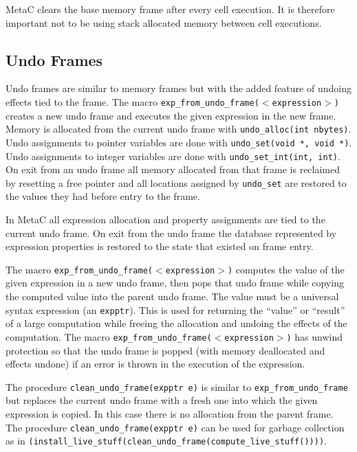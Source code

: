 \documentclass{article}
\begin{document}
MetaC clears the base memory frame after every cell execution.
It is therefore important not to be using
stack allocated memory between cell executions.

\subsection{Undo Frames}
\label{sec:undo}
Undo frames are similar to memory frames but with the added feature of undoing effects tied to the frame.
The macro {\tt exp\_from\_undo\_frame($<$expression$>$)} creates a new undo frame and executes the given expression
in the new frame. Memory is allocated from the current undo frame
with {\tt undo\_alloc(int nbytes)}.  Undo assignments to pointer variables are done with
{\tt undo\_set(void *, void *)}.
Undo assignments to integer variables are done with 
{\tt undo\_set\_int(int, int)}.
On exit from an undo frame all memory allocated from that frame is reclaimed by resetting a free pointer
and all locations assigned by {\tt undo\_set} are restored to the values they had before entry to the frame.

In MetaC all expression allocation and property assignments are tied to the current undo frame.
On exit from the undo frame the database represented by expression properties is restored to
the state that existed on frame entry.

The macro {\tt exp\_from\_undo\_frame($<$expression$>$)} computes the value of the given expression in a new undo frame, then pops that undo frame while
copying the computed value into the parent undo frame.  The value must be a universal syntax expression
(an {\tt expptr}). This is used for returning the ``value'' or ``result'' of a large computation while freeing the allocation
and undoing the effects of the computation.
The macro {\tt exp\_from\_undo\_frame($<$expression$>$)} has unwind protection so that the undo frame is popped (with memory deallocated and effects undone)
if an error is thrown in the execution of the expression.

The procedure {\tt clean\_undo\_frame(expptr e)} is similar to {\tt exp\_from\_undo\_frame} but replaces the current undo frame with a fresh one
into which the given expression is copied.  In this case there is no allocation from the parent frame.
The procedure {\tt clean\_undo\_frame(expptr e)} can be used for garbage collection
as in {\tt (install\_live\_stuff(clean\_undo\_frame(compute\_live\_stuff())))}.
\end{document}
